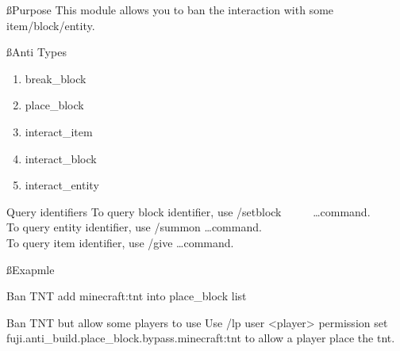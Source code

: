 
\ss{Purpose}
This module allows you to ban the interaction with some item/block/entity.

\ss{Anti Types}
\begin{enumerate}
    \item break\_block
    \item place\_block
    \item interact\_item
    \item interact\_block
    \item interact\_entity
\end{enumerate}

\begin{tips}{Query identifiers}
    To query block identifier, use /setblock ~ ~ ~ \ldots command.\\
    To query entity identifier, use /summon \ldots command.\\
    To query item identifier, use /give \ldots command.
\end{tips}

\ss{Exapmle}
\begin{example}{Ban TNT}
    add minecraft:tnt into place\_block list
\end{example}

\begin{example}{Ban TNT but allow some players to use}
    Use /lp user <player> permission set fuji.anti\_build.place\_block.bypass.minecraft:tnt to
    allow a player place the tnt.
\end{example}


